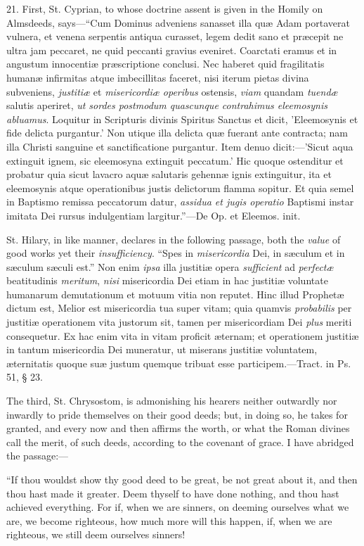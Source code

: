21. First, St. Cyprian, to whose doctrine assent is given in the
Homily on Almsdeeds, says—``Cum Dominus adveniens sanasset illa
quæ Adam portaverat vulnera, et venena serpentis antiqua curasset,
legem dedit sano et præcepit ne ultra jam peccaret, ne quid peccanti
gravius eveniret. Coarctati eramus et in angustum innocentiæ
præscriptione conclusi. Nec haberet quid fragilitatis humanæ
infirmitas atque imbecillitas faceret, nisi iterum pietas divina
subveniens, \emph{justitiæ} et \emph{misericordiæ operibus} ostensis,
\emph{viam} quandam \emph{tuendæ} salutis aperiret, \emph{ut sordes
postmodum quascunque contrahimus eleemosynis abluamus}. Loquitur in
Scripturis divinis Spiritus Sanctus et dicit, 'Eleemosynis et fide
delicta purgantur.' Non utique illa delicta quæ fuerant ante
contracta; nam illa Christi sanguine et sanctificatione purgantur.
Item denuo dicit:—'Sicut aqua extinguit ignem, sic eleemosyna
extinguit peccatum.' Hic quoque ostenditur et probatur quia sicut
lavacro aquæ salutaris gehennæ ignis extinguitur, ita et eleemosynis
atque operationibus justis delictorum flamma sopitur. Et quia semel in
Baptismo remissa peccatorum datur, \emph{assidua et jugis operatio}
Baptismi instar imitata Dei rursus indulgentiam largitur.''—De
Op. et Eleemos. init.

St. Hilary, in like manner, declares in the following passage, both
the \emph{value} of good works yet their \emph{insufficiency}. ``Spes
in \emph{misericordia} Dei, in sæculum et in sæculum sæculi
est.'' Non enim \emph{ipsa} illa justitiæ opera \emph{sufficient} ad \emph{perfectæ}
beatitudinis \emph{meritum}, \emph{nisi} misericordia Dei etiam in hac
justitiæ voluntate humanarum demutationum et motuum vitia non reputet.
Hinc illud Prophetæ dictum est, Melior est misericordia tua
super vitam; quia quamvis \emph{probabilis} per justitiæ operationem
vita justorum sit, tamen per misericordiam Dei \emph{plus} meriti
consequetur. Ex hac enim vita in vitam proficit æternam; et
operationem justitiæ in tantum misericordia Dei muneratur, ut
miserans justitiæ voluntatem, æternitatis quoque suæ justum quemque
tribuat esse participem.—Tract. in Ps. 51, § 23.

The third, St. Chrysostom, is admonishing his hearers neither
outwardly nor inwardly to pride themselves on their good deeds; but,
in doing so, he takes for granted, and every now and then affirms the
worth, or what the Roman divines call the merit, of such deeds,
according to the covenant of grace. I have abridged the passage:—

``If thou wouldst show thy good deed to be great, be not great
about it, and then thou hast made it greater. Deem thyself to have
done nothing, and thou hast achieved everything. For if, when we are
sinners, on deeming ourselves what we are, we become righteous, how
much more will this happen, if, when we are righteous, we still deem
ourselves sinners!


